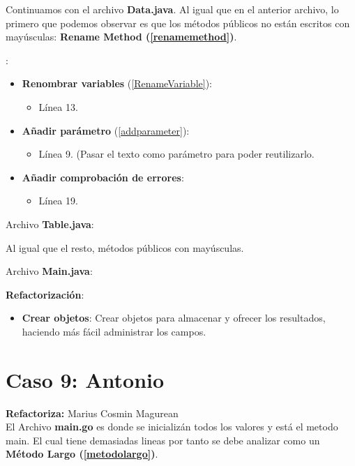 \documentclass[11pt,a4paper,oneside]{book}
\begin{document}
Continuamos con el archivo \textbf{Data.java}. Al igual que en el anterior archivo, lo primero que podemos observar es que los métodos públicos no están escritos con mayúsculas: \textbf{Rename Method (\ref{renamemethod})}.



:
\begin{itemize}
    \item \textbf{Renombrar variables} (\ref{RenameVariable}):
    \begin{itemize}
        \item Línea 13.
    \end{itemize}
    
    \item \textbf{Añadir parámetro} (\ref{addparameter}):
    \begin{itemize}
        \item Línea 9. (Pasar el texto como parámetro para poder reutilizarlo.
    \end{itemize}
    
    \item \textbf{Añadir comprobación de errores}:
    \begin{itemize}
        \item Línea 19.
    \end{itemize}
\end{itemize}

Archivo \textbf{Table.java}:


Al igual que el resto, métodos públicos con mayúsculas.

Archivo \textbf{Main.java}:


\textbf{Refactorización}:
\begin{itemize}
    \item \textbf{Crear objetos}: Crear objetos para almacenar y ofrecer los resultados, haciendo más fácil administrar los campos.
\end{itemize}



\chapter {Caso 9: Antonio}
\textbf{Refactoriza:} Marius Cosmin Magurean\\

El Archivo \textbf{main.go} es donde se inicializán todos los valores y está el metodo main.
El cual tiene demasiadas lineas por tanto se debe analizar como un
\textbf{Método Largo (\ref{metodolargo})}.

\end{document}
